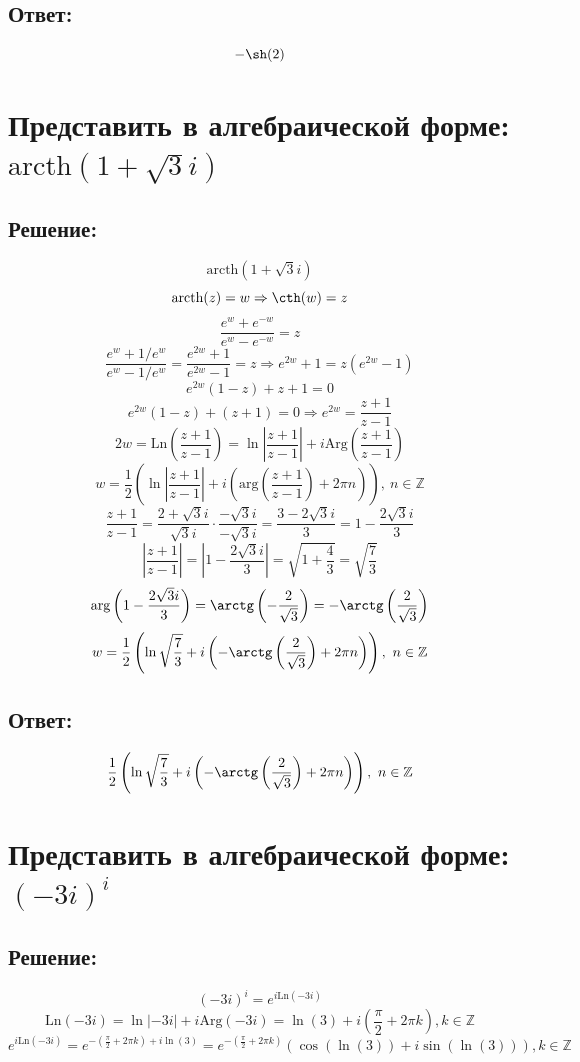\documentclass{article}
\begin{document}
	\subsection{Ответ:}
	\[-\sh(2)\]
	
	\section{Представить в алгебраической форме: $\text{arcth}(1+ \sqrt{3}i)$}
	\subsection{Решение:}
	\[\text{arcth}(1+ \sqrt{3}i)\]
	\[\text{arcth}(z) = w \Rightarrow \cth(w) = z\]
	\[\frac{e^w + e^{-w}}{e^w - e^{-w}} = z\]
	\[\frac{e^w + 1/e^w}{e^w - 1/e^w} = \frac{e^{2w}+1}{e^{2w}-1} = z \Rightarrow e^{2w} + 1 = z \left(e^{2w} -1\right)\]
	\[e^{2w}(1-z) +z +1 = 0\]
	\[e^{2w}(1-z) + (z+1) = 0 \Rightarrow e^{2w} = \frac{z+1}{z-1}\]
	\[2w = \text{Ln}\left(\frac{z+1}{z-1}\right) = \ln \left|\frac{z+1}{z-1}\right| + i\text{Arg}\left(\frac{z+1}{z-1}\right) \]
	\[w=  \frac{1}{2} \left(\ln \left|\frac{z+1}{z-1}\right| + i\left(\text{arg}\left(\frac{z+1}{z-1}\right) +2\pi n\right)\right), \ n \in \mathbb{Z}\]
	\[\frac{z+1}{z-1} = \frac{2 + \sqrt{3}i}{\sqrt{3}i}\cdot \frac{-\sqrt{3}i}{-\sqrt{3}i} = \frac{3 - 2\sqrt{3}i}{3} = 1 - \frac{2\sqrt{3}i}{3}\]
	\[\left|\frac{z+1}{z-1} \right| = \left|1 - \frac{2\sqrt{3}i}{3}\right| = \sqrt{1 + \frac{4}{3}} = \sqrt{\frac{7}{3}}\]
	\[\text{arg}\left(1 -\frac{2\sqrt{3}i}{3}\right) = \arctg\left(-\frac{2}{\sqrt{3}}\right) = -\arctg\left(\frac{2}{\sqrt{3}}\right)\]
	\[w = \frac{1}{2} \left(\ln\sqrt{\frac{7}{3}} + i \left(-\arctg\left(\frac{2}{\sqrt{3}}\right) + 2\pi n\right)\right), \ n \in \mathbb{Z}\]
	\subsection{Ответ:}
	\[\frac{1}{2} \left(\ln\sqrt{\frac{7}{3}} + i \left(-\arctg\left(\frac{2}{\sqrt{3}}\right) + 2\pi n\right)\right), \ n \in \mathbb{Z}\]
	
	\section{Представить в алгебраической форме: $(-3i)^i$}
	\subsection{Решение:}
	\[(-3i)^i = e^{i\text{Ln}(-3i)}\]
	\[\text{Ln}(-3i) = \ln |-3i| + i\text{Arg}(-3i) = \ln(3) + i\left(\frac{\pi}{2} + 2\pi k\right), k \in \mathbb{Z}\]
	\[e^{i\text{Ln}(-3i)} = e ^ {-\left(\frac{\pi}{2} + 2\pi k\right) + i\ln(3)} = e ^ {-\left(\frac{\pi}{2} + 2\pi k\right)}\left(\cos\left(\ln(3)\right) + i\sin\left(\ln(3)\right)\right), k \in \mathbb{Z}\]
\end{document}
